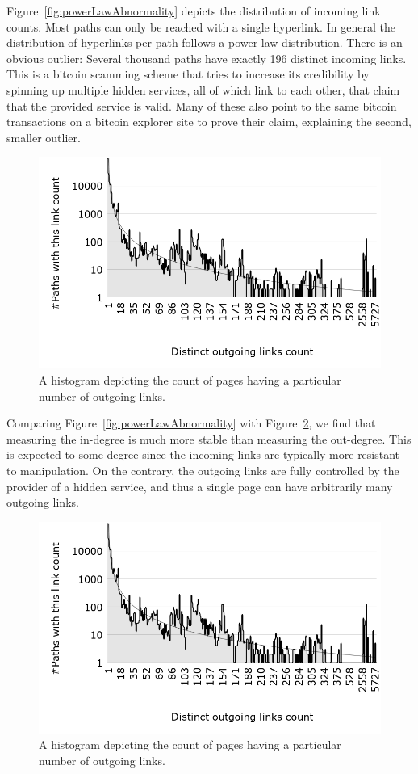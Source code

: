 Figure~\ref{fig:powerLawAbnormality} depicts the distribution of incoming link counts. Most paths can only be reached with a single hyperlink. In general the distribution of hyperlinks per path follows a power law distribution. There is an obvious outlier: Several thousand paths have exactly 196 distinct incoming links. This is a bitcoin scamming scheme that tries to increase its credibility by spinning up multiple hidden services, all of which link to each other, that claim that the provided service is valid. Many of these also point to the same bitcoin transactions on a bitcoin explorer site to prove their claim, explaining the second, smaller outlier.

\iflncs
  \begin{figure}
      \vspace{-15pt}
      \centering
      \includegraphics[trim={6cm 1.5cm 5cm 1cm}, width=0.62\linewidth]{images/DistinctOutgoingLinksCount.png}
      \caption{A histogram depicting the count of pages having a particular number of outgoing links.}
      \label{fig:outgoingPowerLaw}
  \end{figure}
\fi
Comparing Figure~\ref{fig:powerLawAbnormality} with Figure~\ref{fig:outgoingPowerLaw}, we find that measuring the in-degree is much more stable than measuring the out-degree. This is expected to some degree since the incoming links are typically more resistant to manipulation. On the contrary, the outgoing links are fully controlled by the provider of a hidden service, and thus a single page can have arbitrarily many outgoing links.

\ifdgruyter
  \begin{figure}[H]
      \centering
      \includegraphics[width=\linewidth]{images/DistinctOutgoingLinksCount.png}
      \caption{A histogram depicting the count of pages having a particular
               number of outgoing links.}
      \label{fig:outgoingPowerLaw}
  \end{figure}
\fi

